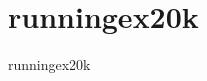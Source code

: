 \section{runningex20k}
\label{sec:datasets:runningex20k}
\begin{datasetDescription}{runningex20k}
\end{datasetDescription}

